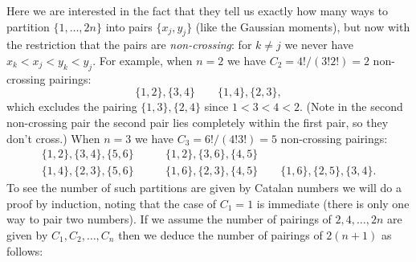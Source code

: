 Here we are interested in the fact that they tell us exactly how many ways to partition $\{1,\ensuremath{\ldots},2n\}$ into pairs $\{x_j,y_j\}$ (like the Gaussian moments), but now with the restriction that the pairs are \emph{non-crossing}: for $k \ensuremath{\neq} j$ we never have $x_k < x_j < y_k < y_j$. For example, when $n = 2$ we have $C_2 = 4!/(3!2!) = 2$ non-crossing pairings:
\[
\{1,2\}, \{3,4\} \qquad \{1,4\}, \{2,3\},
\]
which excludes the pairing $\{1,3\}, \{2,4\}$ since $1 < 3 < 4 < 2$. (Note in the second non-crossing pair the second pair lies completely within the first pair, so they don't cross.) When $n =3$ we have $C_3 = 6!/(4!3!) = 5$ non-crossing pairings:
\begin{align*}
\{1,2\}, \{3,4\}, \{5,6\} &\qquad \{1,2\}, \{3,6\}, \{4,5\} \\
\{1,4\}, \{2,3\}, \{5,6\} &\qquad \{1,6\}, \{2,3\}, \{4,5\} \qquad \{1,6\}, \{2,5\}, \{3,4\}.
\end{align*}
To see the number of such partitions are given by Catalan numbers we will do a proof by induction, noting that the case of  $C_1 = 1$ is immediate (there is only one way to pair two numbers). If we assume the number of pairings of $2, 4, \ensuremath{\ldots}, 2n$ are given by $C_1,C_2,\ensuremath{\ldots},C_n$ then we deduce the number of pairings of $2(n+1)$ as follows:

